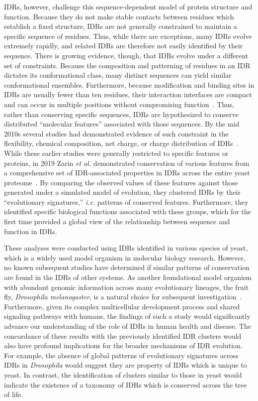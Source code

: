 IDRs, however, challenge this sequence-dependent model of protein structure and function. Because they do not make stable contacts between residues which establish a fixed structure, IDRs are not generally constrained to maintain a specific sequence of residues. Thus, while there are exceptions, many IDRs evolve extremely rapidly, and related IDRs are therefore not easily identified by their sequence. There is growing evidence, though, that IDRs evolve under a different set of constraints. Because the composition and patterning of residues in an IDR dictates its conformational class, many distinct sequences can yield similar conformational ensembles. Furthermore, because modification and binding sites in IDRs are usually fewer than ten residues, their interaction interfaces are compact and can occur in multiple positions without compromising function~\cite{Tompa2014}. Thus, rather than conserving specific sequences, IDRs are hypothesized to conserve distributed ``molecular features'' associated with those sequences. By the mid 2010s several studies had demonstrated evidence of such constraint in the flexibility, chemical composition, net charge, or charge distribution of IDRs~\cite{Daughdrill2007, Moesa2012, Zarin2017, Beh2012}. While these earlier studies were generally restricted to specific features or proteins, in 2019 Zarin \textit{et al.} demonstrated conservation of various features from a comprehensive set of IDR-associated properties in IDRs across the entire yeast proteome~\cite{Zarin2019}. By comparing the observed values of these features against those generated under a simulated model of evolution, they clustered IDRs by their ``evolutionary signatures,'' \textit{i.e.} patterns of conserved features. Furthermore, they identified specific biological functions associated with these groups, which for the first time provided a global view of the relationship between sequence and function in IDRs.

These analyses were conducted using IDRs identified in various species of yeast, which is a widely used model organism in molecular biology research. However, no known subsequent studies have determined if similar patterns of conservation are found in the IDRs of other systems. As another foundational model organism with abundant genomic information across many evolutionary lineages, the fruit fly, \textit{Drosophila melanogaster}, is a natural choice for subsequent investigation~\cite{Yang2018, Miller2018, Kim2021, Gramates2022}. Furthermore, given its complex multicellular development process and shared signaling pathways with humans, the findings of such a study would significantly advance our understanding of the role of IDRs in human health and disease. The concordance of these results with the previously identified IDR clusters would also have profound implications for the broader mechanisms of IDR evolution. For example, the absence of global patterns of evolutionary signatures across IDRs in \textit{Drosophila} would suggest they are property of IDRs which is unique to yeast. In contrast, the identification of clusters similar to those in yeast would indicate the existence of a taxonomy of IDRs which is conserved across the tree of life.

